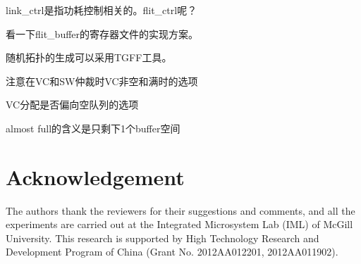 \documentclass[10pt,journal]{IEEEtran}
\begin{document}
link\_ctrl是指功耗控制相关的。flit\_ctrl呢？

看一下flit\_buffer的寄存器文件的实现方案。

随机拓扑的生成可以采用TGFF工具。

注意在VC和SW仲裁时VC非空和满时的选项

VC分配是否偏向空队列的选项

almost full的含义是只剩下1个buffer空间

\section*{Acknowledgement}
The authors thank the reviewers for their suggestions and comments, and all the experiments are carried out at the Integrated Microsystem Lab (IML) of McGill University. This research is supported by High Technology Research and Development Program of China (Grant No. 2012AA012201, 2012AA011902).



\end{document}
